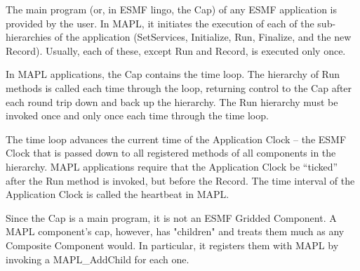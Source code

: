 %  
%  
%  

 The main program (or, in ESMF lingo, the Cap) of any ESMF application is 
 provided by the user. In MAPL, it initiates the execution of each of the
 sub-hierarchies of the application (SetServices, Initialize, Run,
 Finalize, and the new Record). Usually, each of these, except Run and Record,
 is executed only once.
 
 In MAPL applications, the Cap contains the time loop.
 The hierarchy of Run methods is called each time through the loop,
 returning control to the Cap after each round trip down and back up
 the hierarchy. The Run hierarchy must be invoked once and only once
 each time through the time loop.
 
 The time loop advances the current time of the Application Clock -- the ESMF
 Clock that is passed down to all registered methods of all components in
 the hierarchy. MAPL applications require that the Application Clock be
 ``ticked'' after the Run method is invoked, but before the Record.
 The time interval of the Application Clock is called the heartbeat in MAPL.
 
 
 Since the Cap is a main program, it is not an ESMF Gridded Component.
 A MAPL component's cap, however, has "children" and treats them much
 as any Composite Component would. In particular, it registers them with
 MAPL by invoking a MAPL\_AddChild for each one.
 
